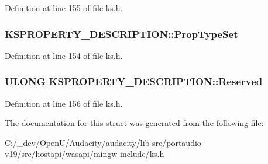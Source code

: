 Definition at line 155 of file ks.\+h.

\subsubsection[{\texorpdfstring{Prop\+Type\+Set}{PropTypeSet}}]{ K\+S\+P\+R\+O\+P\+E\+R\+T\+Y\+\_\+\+D\+E\+S\+C\+R\+I\+P\+T\+I\+O\+N\+::\+Prop\+Type\+Set}\hypertarget{struct_k_s_p_r_o_p_e_r_t_y___d_e_s_c_r_i_p_t_i_o_n_a85872a0db90034b720592d555b15369a}{}\label{struct_k_s_p_r_o_p_e_r_t_y___d_e_s_c_r_i_p_t_i_o_n_a85872a0db90034b720592d555b15369a}


Definition at line 154 of file ks.\+h.

\subsubsection[{\texorpdfstring{Reserved}{Reserved}}]{\setlength{\rightskip}{0pt plus 5cm}U\+L\+O\+NG K\+S\+P\+R\+O\+P\+E\+R\+T\+Y\+\_\+\+D\+E\+S\+C\+R\+I\+P\+T\+I\+O\+N\+::\+Reserved}\hypertarget{struct_k_s_p_r_o_p_e_r_t_y___d_e_s_c_r_i_p_t_i_o_n_ae4fe02efb0464f5b30255f6fd4ef2d45}{}\label{struct_k_s_p_r_o_p_e_r_t_y___d_e_s_c_r_i_p_t_i_o_n_ae4fe02efb0464f5b30255f6fd4ef2d45}


Definition at line 156 of file ks.\+h.



The documentation for this struct was generated from the following file\+:\begin{DoxyCompactItemize}
\item 
C\+:/\+\_\+dev/\+Open\+U/\+Audacity/audacity/lib-\/src/portaudio-\/v19/src/hostapi/wasapi/mingw-\/include/\hyperlink{ks_8h}{ks.\+h}\end{DoxyCompactItemize}
